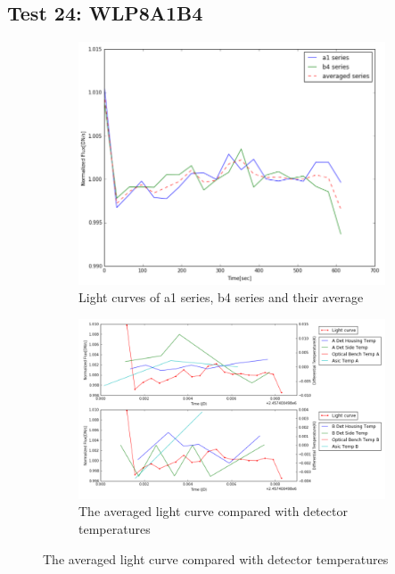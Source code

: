 \documentclass{aastex6}
\begin{document}
\subsection{Test 24: WLP8A1B4} 
\begin{figure}[H]
    \centering
    \begin{subfigure}{1}
        \includegraphics[scale=0.4]{ts_test24}
        \caption{Light curves of a1 series, b4 series and their average}
    \end{subfigure}

    \begin{subfigure}{2}
        \includegraphics[scale=0.4]{temp_test24}
        \caption{The averaged light curve compared with detector temperatures}
    \end{subfigure}
   

\end{figure}
\end{document}
